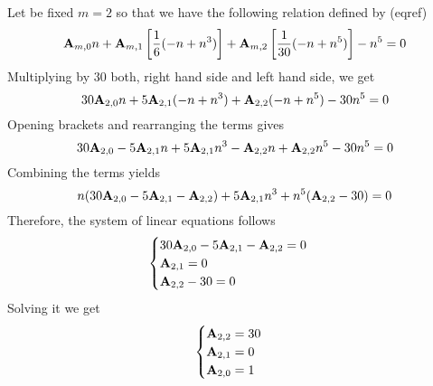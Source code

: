 \begin{examp}
    Let be fixed $m=2$ so that we have the following relation defined by (eqref)
    \begin{equation*}
        {\mathbf{A}} \sb{m,0} n
        + {\mathbf{A}} \sb{m,1} \left[ \frac{1}{6} (-n + n^3) \right]
        + {\mathbf{A}} \sb{m,2} \left[ \frac{1}{30} (-n + n^5) \right] - n^5 = 0
    \end{equation*}
    Multiplying by $30$ both, right hand side and left hand side, we get
    \begin{equation*}
        30 {\mathbf{A}} \sb{2,0} n + 5 {\mathbf{A}} \sb{2,1} (-n + n^3) + {\mathbf{A}} \sb{2,2} (-n + n^5) - 30n^5 = 0
    \end{equation*}
    Opening brackets and rearranging the terms gives
    \begin{equation*}
        30 {\mathbf{A}} \sb{2,0} - 5 {\mathbf{A}} \sb{2,1} n + 5 {\mathbf{A}} \sb{2,1} n^3 - {\mathbf{A}} \sb{2,2} n + {\mathbf{A}} \sb{2,2} n^5 - 30n^5 = 0
    \end{equation*}
    Combining the terms yields
    \begin{equation*}
        n (30 {\mathbf{A}} \sb{2,0} - 5 {\mathbf{A}} \sb{2,1} - {\mathbf{A}} \sb{2,2}) + 5 {\mathbf{A}} \sb{2,1} n^3 + n^5 ({\mathbf{A}} \sb{2,2} - 30) = 0
    \end{equation*}
    Therefore, the system of linear equations follows
    \begin{equation*}
        \begin{cases}
            30 {\mathbf{A}} \sb{2,0} - 5 {\mathbf{A}} \sb{2,1} - {\mathbf{A}} \sb{2,2} = 0 \\
            {\mathbf{A}} \sb{2,1} = 0 \\
            {\mathbf{A}} \sb{2,2} - 30 = 0
        \end{cases}
    \end{equation*}
    Solving it we get
    \begin{equation*}
        \begin{cases}
            {\mathbf{A}} \sb{2,2} = 30 \\
            {\mathbf{A}} \sb{2,1} = 0 \\
            {\mathbf{A}} \sb{2,0} = 1
        \end{cases}
    \end{equation*}
\end{examp}